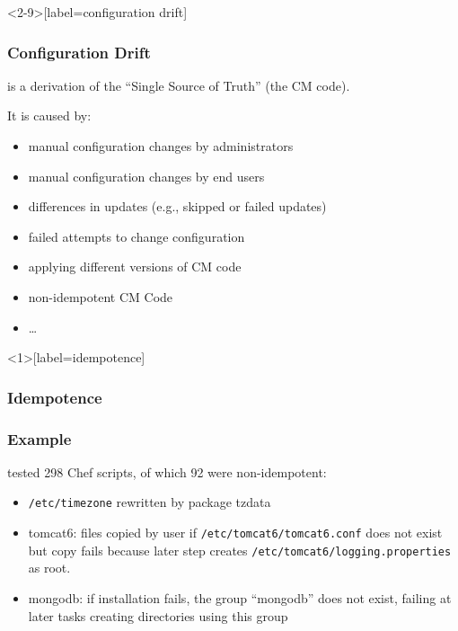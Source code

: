 \begin{frame}<2-9>[label=configuration drift]
	\frametitle{Configuration Drift}

	\pause

	is a derivation of the ``Single Source of Truth'' (the CM code).

	\vspace{1em}
	It is caused by:

	\pause

	\begin{itemize}[<+-| alert@+>]
	\item manual configuration changes by administrators
	\item manual configuration changes by end users
	\item differences in updates (e.g., skipped or failed updates)
	\item failed attempts to change configuration
	\item applying different versions of CM code
	\item non-idempotent CM Code
	\item \dots
	\end{itemize}
\end{frame}

\begin{frame}<1>[label=idempotence]
	\frametitle{Idempotence}


\end{frame}

\begin{frame}
	\frametitle{Example}
	\citet{waldemar2013testing} tested 298 Chef scripts, of which 92 were non-idempotent:

	\begin{itemize}[<+-| alert@+>]
	\item \texttt{/etc/timezone} rewritten by package tzdata
	\item tomcat6: files copied by user if \texttt{/etc/tomcat6/tomcat6.conf} does not exist but copy fails because later step creates \texttt{/etc/tomcat6/logging.properties} as root.
	\item mongodb: if installation fails, the group ``mongodb'' does not exist, failing at later tasks creating directories using this group
	\end{itemize}
\end{frame}

